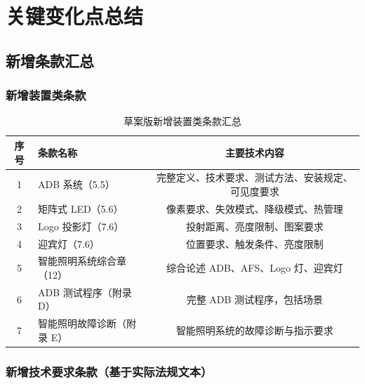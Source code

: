 \chapter{关键变化点总结}

\section{新增条款汇总}

\subsection{新增装置类条款}

\begin{table}[H]
\centering
\caption{草案版新增装置类条款汇总}
\small
\begin{tabularx}{\textwidth}{|c|X|c|}
\hline
\textbf{序号} & \textbf{条款名称} & \textbf{主要技术内容} \\
\hline
1 & ADB 系统（5.5）       & 完整定义、技术要求、测试方法、安装规定、可见度要求 \\
\hline
2 & 矩阵式 LED（5.6）    & 像素要求、失效模式、降级模式、热管理 \\
\hline
3 & Logo 投影灯（7.6）  & 投射距离、亮度限制、图案要求 \\
\hline
4 & 迎宾灯（7.6）       & 位置要求、触发条件、亮度限制 \\
\hline
5 & 智能照明系统综合章（12） & 综合论述 ADB、AFS、Logo 灯、迎宾灯 \\
\hline
6 & ADB 测试程序（附录 D） & 完整 ADB 测试程序，包括场景 \\
\hline
7 & 智能照明故障诊断（附录 E）& 智能照明系统的故障诊断与指示要求 \\
\hline
\end{tabularx}
\end{table}

\subsection{新增技术要求条款（基于实际法规文本）}

